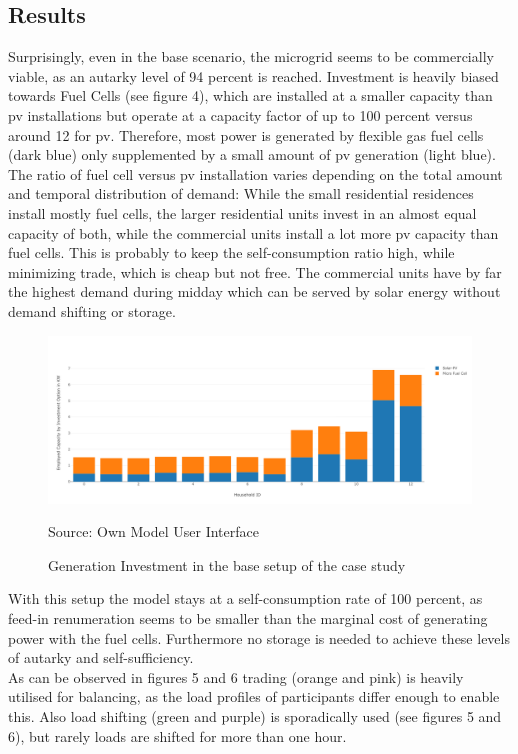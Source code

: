\documentclass[
	11pt,								%
	DIV10,								%
	a4paper,         					%
	oneside,							%
	headheight=20pt,					%
	footheight=20pt,					%
    parskip=full,						%
    listof=totoc,						%
	bibliography=totoc,					%
	index=totoc,						%
]{scrartcl}
\begin{document}
\subsection{Results}
Surprisingly, even in the base scenario, the microgrid seems to be commercially viable, as an autarky level of 94 percent is reached. Investment is heavily biased towards Fuel Cells (see figure 4), which are installed at a smaller capacity than pv installations but operate at a capacity factor of up to 100 percent versus around 12 for pv. Therefore, most power is generated by flexible gas fuel cells (dark blue) only supplemented by a small amount of pv generation (light blue).\\
The ratio of fuel cell versus pv installation varies depending on the total amount and temporal distribution of demand: While the small residential residences install mostly fuel cells, the larger residential units invest in an almost equal capacity of both, while the commercial units install a lot more pv capacity than fuel cells. This is probably to keep the self-consumption ratio high, while minimizing trade, which is cheap but not free. The commercial units have by far the highest demand during midday which can be served by solar energy without demand shifting or storage.
\begin{figure}[H]
	\centering
	\includegraphics[width=1\textwidth]{pictures/INV_GEN_Base.png}
	\caption{Generation Investment in the base setup of the case study}
	\label{gen_investment_base}
	\flushleft\quad\quad\footnotesize{Source: Own Model User Interface}
\end{figure}
With this setup the model stays at a self-consumption rate of 100 percent, as feed-in renumeration seems to be smaller than the marginal cost of generating power with the fuel cells. Furthermore no storage is needed to achieve these levels of autarky and self-sufficiency. \\
As can be observed in figures 5 and 6 trading (orange and pink) is heavily utilised for balancing, as the load profiles of participants differ enough to enable this. Also load shifting (green and purple) is sporadically used (see figures 5 and 6), but rarely loads are shifted for more than one hour.
\end{document}

